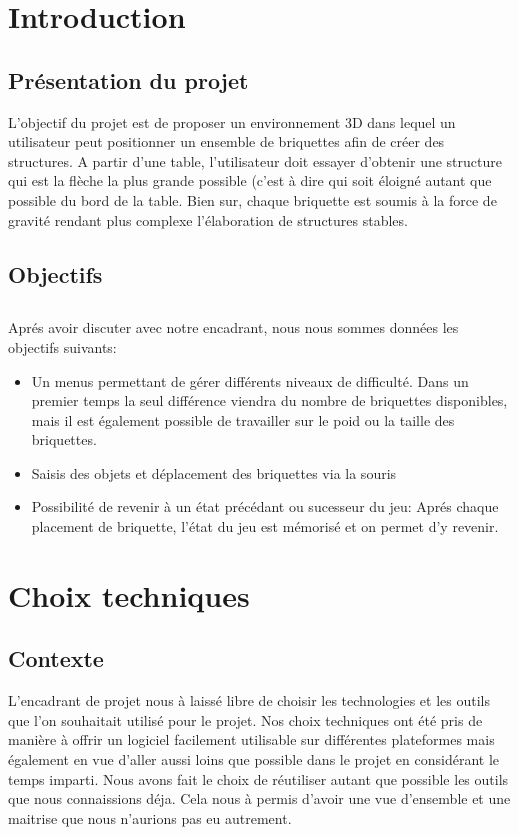 \documentclass[frenchb,twoside]{EPURapport}
\begin{document}
\chapter{Introduction}

\section{Présentation du projet}
    L'objectif du projet est de proposer un environnement 3D dans lequel un
    utilisateur peut positionner un ensemble de briquettes afin de créer des
    structures. A partir d'une table, l'utilisateur doit essayer d'obtenir une
    structure qui est la flèche la plus grande possible (c'est à dire qui soit
    éloigné autant que possible du bord de la table.
    Bien sur, chaque briquette est soumis à la force de gravité rendant plus
    complexe l'élaboration de structures stables.

\section{Objectifs}


\section{}
    Aprés avoir discuter avec notre encadrant, nous nous sommes données les objectifs suivants:
    \begin{itemize}
        \item Un menus permettant de gérer différents niveaux de difficulté.
        Dans un premier temps la seul différence viendra du nombre de
        briquettes disponibles, mais il est également possible de travailler
        sur le poid ou la taille des briquettes.
        \item Saisis des objets et déplacement des briquettes via la souris
        \item Possibilité de revenir à un état précédant ou sucesseur du jeu:
        Aprés chaque placement de briquette, l'état du jeu est mémorisé et on
        permet d'y revenir.
        
    \end{itemize}
   
    
    
\chapter{Choix techniques}
    \section{Contexte}
    L'encadrant de projet nous à laissé libre de choisir les technologies et
    les outils que l'on souhaitait utilisé pour le projet. Nos choix techniques
    ont été pris de manière à offrir un logiciel facilement utilisable sur
    différentes plateformes mais également en vue d'aller aussi loins que
    possible dans le projet en considérant le temps imparti. Nous avons fait le
    choix de réutiliser autant que possible les outils que nous connaissions
    déja. Cela nous à permis d'avoir une vue d'ensemble et une maitrise que
    nous n'aurions pas eu autrement.
\end{document}
